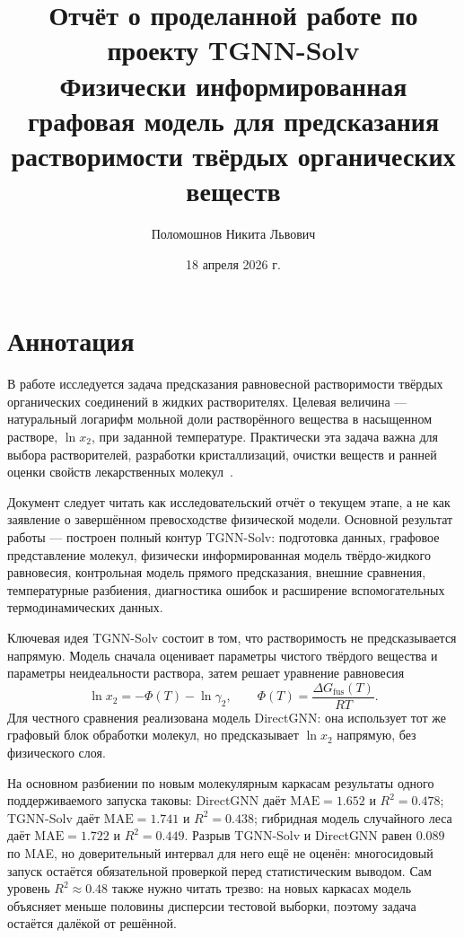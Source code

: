 \documentclass[11pt]{article}
\title{Отчёт о проделанной работе по проекту TGNN-Solv\\
\large Физически информированная графовая модель для предсказания растворимости твёрдых органических веществ}
\author{Поломошнов Никита Львович}
\date{18 апреля 2026 г.}
\newcommand{\mae}{\mathrm{MAE}}
\newcommand{\Rtwo}{R^2}
\theoremstyle{definition}
\begin{document}
\sloppy
\maketitle
\tableofcontents
\newpage

\section*{Аннотация}

В работе исследуется задача предсказания равновесной растворимости твёрдых органических соединений в жидких растворителях. Целевая величина --- натуральный логарифм мольной доли растворённого вещества в насыщенном растворе, $\ln x_2$, при заданной температуре. Практически эта задача важна для выбора растворителей, разработки кристаллизаций, очистки веществ и ранней оценки свойств лекарственных молекул~\cite{boobier2017,vermeire2022,fastsolv2025}.

Документ следует читать как исследовательский отчёт о текущем этапе, а не как заявление о завершённом превосходстве физической модели. Основной результат работы --- построен полный контур TGNN-Solv: подготовка данных, графовое представление молекул, физически информированная модель твёрдо-жидкого равновесия, контрольная модель прямого предсказания, внешние сравнения, температурные разбиения, диагностика ошибок и расширение вспомогательных термодинамических данных.

Ключевая идея TGNN-Solv состоит в том, что растворимость не предсказывается напрямую. Модель сначала оценивает параметры чистого твёрдого вещества и параметры неидеальности раствора, затем решает уравнение равновесия
\begin{equation*}
    \ln x_2 = -\Phi(T) - \ln \gamma_2,
    \qquad
    \Phi(T)=\frac{\Delta G_{\mathrm{fus}}(T)}{RT}.
\end{equation*}
Для честного сравнения реализована модель DirectGNN: она использует тот же графовый блок обработки молекул, но предсказывает $\ln x_2$ напрямую, без физического слоя.

На основном разбиении по новым молекулярным каркасам результаты одного поддерживаемого запуска таковы: DirectGNN даёт $\mae=1.652$ и $\Rtwo=0.478$; TGNN-Solv даёт $\mae=1.741$ и $\Rtwo=0.438$; гибридная модель случайного леса даёт $\mae=1.722$ и $\Rtwo=0.449$. Разрыв TGNN-Solv и DirectGNN равен $0.089$ по MAE, но доверительный интервал для него ещё не оценён: многосидовый запуск остаётся обязательной проверкой перед статистическим выводом. Сам уровень $\Rtwo\approx0.48$ также нужно читать трезво: на новых каркасах модель объясняет меньше половины дисперсии тестовой выборки, поэтому задача остаётся далёкой от решённой.
\end{document}
